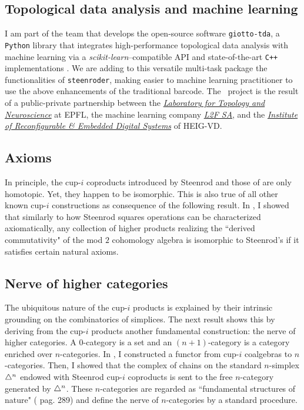 \subsection{Topological data analysis and machine learning} \label{ss:giotto}

I am part of the team that develops the open-source software \texttt{giotto-tda}, a \texttt{Python} library that integrates high-performance topological data analysis with machine learning via a \emph{scikit-learn}--compatible API and state-of-the-art \texttt{C++} implementations \cite{medina2021giotto}.
We are adding to this versatile multi-task package the functionalities of \texttt{steenroder}, making easier to machine learning practitioner to use the above enhancements of the traditional barcode.
The \giottoTDA\ project is the result of a public-private partnership between the \href{https://www.epfl.ch/labs/hessbellwald-lab/}{\textit{Laboratory for Topology and Neuroscience}} at EPFL, the machine learning company \href{https://www.l2f.ch/}{\textit{L2F SA}}, and the \href{https://heig-vd.ch/en/research/reds}{\textit{Institute of Reconfigurable \& Embedded Digital Systems}} of HEIG-VD.

\subsection{Axioms}

In principle, the cup-$i$ coproducts introduced by Steenrod and those of \cite{medina2023fast_sq} are only homotopic.
Yet, they happen to be isomorphic.
This is also true of all other known cup-$i$ constructions as consequence of the following result.
In \cite{medina2022axiomatic}, I showed that similarly to how Steenrod squares operations can be characterized axiomatically, any collection of higher products realizing the ``derived commutativity" of the mod $2$ cohomology algebra is isomorphic to Steenrod's if it satisfies certain natural axioms.

\subsection{Nerve of higher categories} \label{ss:nerve}

The ubiquitous nature of the cup-$i$ products is explained by their intrinsic grounding on the combinatorics of simplices.
The next result shows this by deriving from the cup-$i$ products another fundamental construction: the nerve of higher categories.
A $0$-category is a set and an $(n+1)$-category is a category enriched over $n$-categories.
In \cite{medina2020globular}, I constructed a functor from cup-$i$ coalgebras to $n$-categories.
Then, I showed that the complex of chains on the standard $n$-simplex $\triangle^n$ endowed with Steenrod cup-$i$ coproducts is sent to the free $n$-category generated by $\triangle^n$.
These $n$-categories are regarded as ``fundamental structures of nature" (\cite{street1987orientals} pag. 289) and define the nerve of $n$-categories by a standard procedure.

